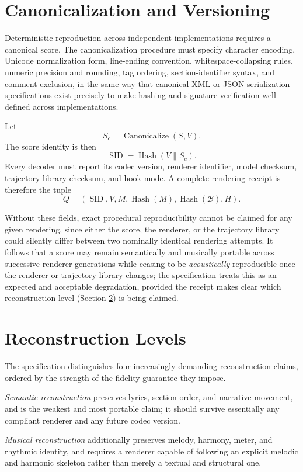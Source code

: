\documentclass[11pt]{article}
\DeclareMathOperator{\Canonicalize}{Canonicalize}
\DeclareMathOperator{\Hash}{Hash}
\begin{document}
\section{Canonicalization and Versioning}

Deterministic reproduction across independent implementations requires a canonical score. The canonicalization procedure must specify character encoding, Unicode normalization form, line-ending convention, whitespace-collapsing rules, numeric precision and rounding, tag ordering, section-identifier syntax, and comment exclusion, in the same way that canonical XML or JSON serialization specifications exist precisely to make hashing and signature verification well defined across implementations.

Let
\[
S_c=\Canonicalize(S,V).
\]
The score identity is then
\[
\operatorname{SID}
=
\Hash(V\parallel S_c).
\]
Every decoder must report its codec version, renderer identifier, model checksum, trajectory-library checksum, and hook mode. A complete rendering receipt is therefore the tuple
\[
Q=
(
\operatorname{SID},
V,
M,
\Hash(M),
\Hash(\mathcal{B}),
H
).
\]

Without these fields, exact procedural reproducibility cannot be claimed for any given rendering, since either the score, the renderer, or the trajectory library could silently differ between two nominally identical rendering attempts. It follows that a score may remain semantically and musically portable across successive renderer generations while ceasing to be \emph{acoustically} reproducible once the renderer or trajectory library changes; the specification treats this as an expected and acceptable degradation, provided the receipt makes clear which reconstruction level (Section \ref{sec:levels}) is being claimed.

\section{Reconstruction Levels}
\label{sec:levels}

The specification distinguishes four increasingly demanding reconstruction claims, ordered by the strength of the fidelity guarantee they impose.

\emph{Semantic reconstruction} preserves lyrics, section order, and narrative movement, and is the weakest and most portable claim; it should survive essentially any compliant renderer and any future codec version.

\emph{Musical reconstruction} additionally preserves melody, harmony, meter, and rhythmic identity, and requires a renderer capable of following an explicit melodic and harmonic skeleton rather than merely a textual and structural one.
\end{document}
